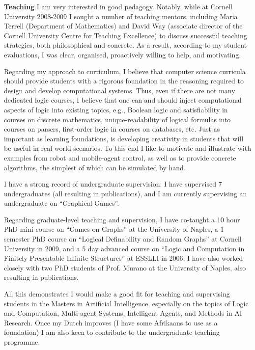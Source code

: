 \documentclass[10.5pt,a4paper,sans]{moderncv}
\begin{document}
\textbf{Teaching}
I am very interested in good pedagogy. Notably, while at Cornell University 2008-2009 I sought a number of teaching mentors, including Maria Terrell (Department of Mathematics) and David Way (associate director of the Cornell University Centre for Teaching Excellence) to discuss successful teaching strategies, both philosophical and concrete. As a result, according to my student evaluations, I was clear, organised, proactively willing to help, and motivating.


Regarding my approach to curriculum, I believe that computer science curricula should provide students with a rigorous foundation in the reasoning required to design and develop computational systems. Thus, even if there are not many dedicated logic courses, I believe that one can and should inject computational aspects of logic into existing topics, e.g., Boolean logic and satisfiability in courses on discrete mathematics, unique-readability of logical formulas into courses on parsers, first-order logic in courses on databases, etc. Just as important as learning foundations, is developing creativity in students that will be useful in real-world scenarios. To this end I like to motivate and illustrate with examples from robot and mobile-agent control, as well as to provide concrete algorithms, the simplest of which can be simulated by hand.

I have a strong record of undergraduate supervision: I have supervised 7 undergraduates (all resulting in publications), and I am currently supervising an undergraduate on ``Graphical Games''.


Regarding graduate-level teaching and supervision, I have co-taught a 10 hour PhD mini-course on ``Games on Graphs'' at the University of Naples, 
a 1 semester PhD course on ``Logical Definability and Random Graphs'' at Cornell University in 2009, and 
a 5 day advanced course on ``Logic and Computation in Finitely Presentable Infinite Structures'' at ESSLLI in 2006. I have also worked closely with two PhD students of Prof. Murano at the University of Naples, also resulting in publications.

All this demonstrates I would make a good fit for teaching and supervising students in the Masters in Artificial Intelligence, especially on the topics of Logic and Computation, Multi-agent Systems, Intelligent Agents, and Methods in AI Research. Once my Dutch improves (I have some Afrikaans to use as a foundation) I am also keen to contribute to the undergraduate teaching programme.
\end{document}

